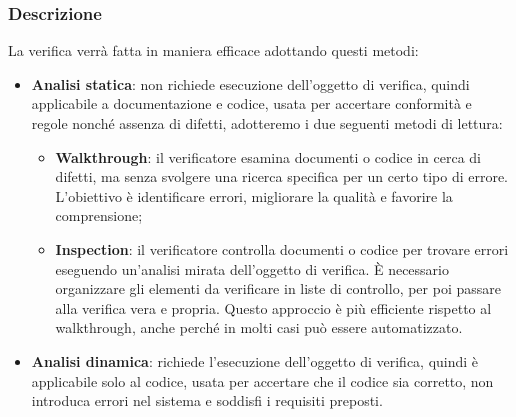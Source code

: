 \subsubsection{Descrizione}
La verifica verrà fatta in maniera efficace adottando questi metodi:
\begin{itemize}
      \item \textbf{Analisi statica}: non richiede esecuzione dell'oggetto di verifica, quindi applicabile a documentazione e codice, usata per accertare conformità e regole nonché assenza di difetti, adotteremo i due seguenti metodi di lettura:
            \begin{itemize}
                  \item \textbf{Walkthrough}: il verificatore esamina documenti o codice in cerca di difetti, ma senza svolgere una
                        ricerca specifica per un certo tipo di errore. L'obiettivo è identificare errori, migliorare la qualità e favorire la comprensione;
                  \item \textbf{Inspection}: il verificatore controlla documenti o codice per trovare errori
                        eseguendo un'analisi mirata dell'oggetto di verifica. È necessario organizzare gli elementi da verificare in liste di controllo,
                        per poi passare alla verifica vera e propria. Questo approccio è più efficiente rispetto al walkthrough, 
                        anche perché in molti casi può essere automatizzato.
            \end{itemize}
      \item \textbf{Analisi dinamica}: richiede l'esecuzione dell'oggetto di verifica, quindi è applicabile solo al codice, usata per accertare che il codice sia corretto, non introduca errori nel sistema e soddisfi i requisiti preposti.
\end{itemize}
